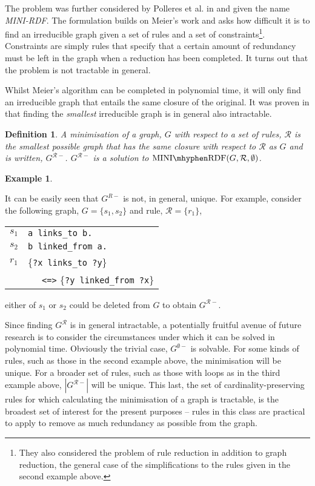 \documentclass{article}
\newtheorem{defn}{Definition}
\newtheorem{example}{Example}
\begin{document}
The problem was further considered by Polleres et al. in
\cite{MINI10} and given the name {\em MINI-RDF}. The 
formulation builds on Meier's work and asks how 
difficult it is to find an irreducible graph given a
set of rules and a set of constraints\footnote{
  They also considered the problem of rule reduction
  in addition to graph reduction, the general case
  of the simplifications to the rules given in
  the second example above.
}. Constraints are simply rules that specify that a
certain amount of redundancy must be left in the graph
when a reduction has been completed. It turns out that
the problem is not tractable in general.

Whilst Meier's algorithm can be completed in polynomial
time, it will only find an irreducible graph that 
entails the same closure of the original. It was 
proven in \cite{MINI10} that finding the {\em smallest}
irreducible graph is in general also intractable.

\begin{defn}
  A {\em minimisation} of a graph, $G$ with respect to
  a set of rules, $\mathcal{R}$ is the smallest possible
  graph that has the same closure with respect to 
  $\mathcal {R}$ as $G$ and is written,
  $G^{\mathcal{R}-}$. $G^{\mathcal{R}-}$ is a solution
  to $\mathrm{MINI \mhyphen RDF}(G, \mathcal{R}, \emptyset)$.
\end{defn}

\begin{example}
\end{example}
It can be easily seen that $G^{R-}$ is not, in general,
unique. For example, consider the following graph,
$G = \{ s_1, s_2 \}$ and rule, ${\mathcal R} = \{ r_1 \}$,
\smallskip
\begin{center}
  \begin{tabular}{l|l}
    $s_1$ & \texttt{a links\_to b.} \\
    $s_2$ & \texttt{b linked\_from a.} \\
    \hline
    $r_1$ & \{\texttt{?x links\_to ?y}\} \\
    & $\;\;\;\;$ \texttt{<=>} \{\texttt{?y linked\_from ?x}\}
  \end{tabular}
\end{center}
\smallskip
either of $s_1$ or $s_2$ could be deleted from $G$ to obtain
$G^{\mathcal{R}-}$. 

Since finding $G^{\mathcal{R}}$ is in general intractable, a
potentially fruitful avenue of future research is to consider
the circumstances under which it can be solved in polynomial
time. Obviously the trivial case, $G^{\emptyset -}$ is 
solvable. For some kinds of rules, such as those in the
second example above, the minimisation will be unique. For
a broader set of rules, such as those with loops as in the
third example above, $|G^{\mathcal{R}-}|$ will be unique.
This last, the set of cardinality-preserving rules for
which calculating the minimisation of a graph is tractable,
is the broadest set of interest for the present purposes
-- rules in this class are practical to apply to remove as
much redundancy as possible from the graph.
\end{document}
